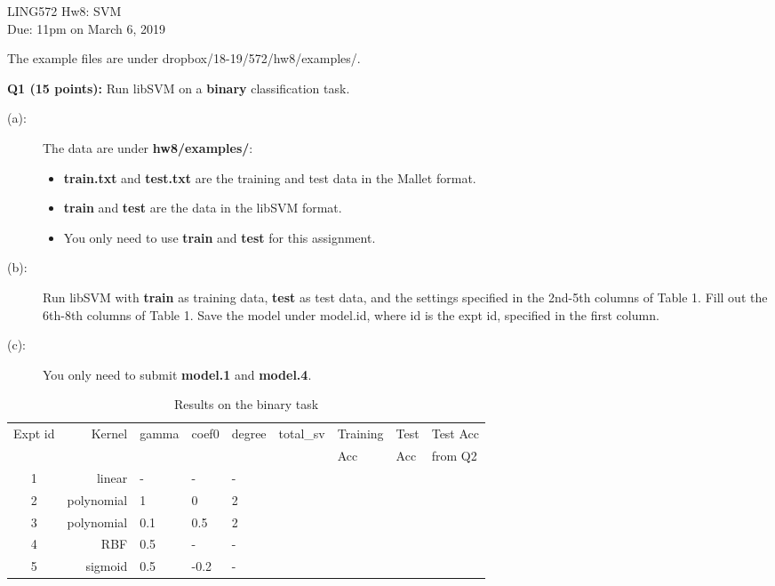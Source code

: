 \documentclass[11pt]{article}
\begin{document}
\begin{center}
\LARGE
LING572 Hw8: SVM\\
Due: 11pm on March 6, 2019\\
\vspace{0.3in}
\end{center}

The example files are under dropbox/18-19/572/hw8/examples/.


\vspace{0.4 in}

\hspace{-0.3in}
{\bf Q1 (15 points):} Run libSVM on a {\bf binary} classification task.
\begin{description}
 \item [(a):]  The data are under {\bf hw8/examples/}:
    \begin{itemize}
      \item {\bf train.txt} and {\bf test.txt} are the training and 
             test data in the Mallet format.
      \item {\bf train} and {\bf test} are the data in the libSVM format.
      \item You only need to use {\bf train} and {\bf test} for this assignment.
    \end{itemize}

 \item [(b):] Run libSVM with {\bf train} as training data, {\bf test}
              as test data, and the settings specified 
              in the 2nd-5th columns of Table 1. Fill out the 
              6th-8th columns of Table 1. Save the model under 
              model.id, where id is the expt id, specified in the first
              column.
           
 \item [(c):] You only need to submit {\bf model.1} and {\bf model.4}.
              
\end{description}


\begin{table}[h]
\centering
\caption{Results on the binary task}
\label{table1}
\begin{tabular}{|c|r|l|l|l|r|l|l|l|} \hline

Expt id & Kernel  & gamma  &  coef0  & degree & total\_sv & Training & Test & Test Acc\\ 
        &         &        &         &        &           & Acc      & Acc  &  from Q2 \\ \hline
1 & linear      & -   & -    & -  & &  &  & \\ \hline
2 & polynomial  & 1   & 0    & 2  & &  &  & \\ \hline
3 & polynomial  & 0.1 & 0.5  & 2  & &  &  & \\ \hline
4 & RBF         & 0.5 & -    & -  & &  &  & \\ \hline
5 & sigmoid     & 0.5 & -0.2 & -  & &  &  & \\ \hline

\end{tabular}
\end{table}
\end{document}
